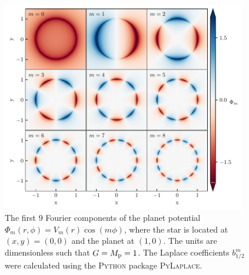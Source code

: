 \begin{figure}
    \centering
    \includegraphics[width = 0.95\textwidth]{figures/planet_components.pdf}
    \caption{The first 9 Fourier components of the planet potential $\Phi_m(r,\phi) = V_m(r) \cos (m \phi)$, where the star is located at $(x,y) = (0,0)$ and the planet at $(1,0)$. The units are dimensionless such that $G=M_{\rm p}=1$. The Laplace coefficients $b_{1/2}^m$ were calculated using the \textsc{Python} package \textsc{PyLaplace}\protect\footnotemark.}
    \label{fig:planet_fourier}
\end{figure}


